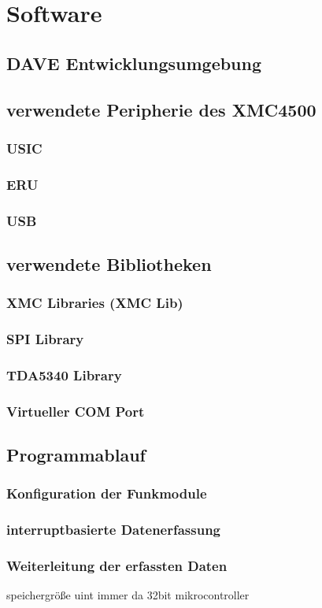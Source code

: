 \chapter{Software}
\label{sec:Software}
\pagestyle{scrheadings}
\section{DAVE Entwicklungsumgebung}
\section{verwendete Peripherie des XMC4500}
\subsection{USIC}
\subsection{ERU}
\subsection{USB}
\section{verwendete Bibliotheken}
\subsection{XMC Libraries (XMC Lib)}
\subsection{SPI Library}
\subsection{TDA5340 Library}
\subsection{Virtueller COM Port}
\section{Programmablauf}
\subsection{Konfiguration der Funkmodule}
\subsection{interruptbasierte Datenerfassung}
\subsection{Weiterleitung der erfassten Daten}
speichergröße uint immer da 32bit mikrocontroller